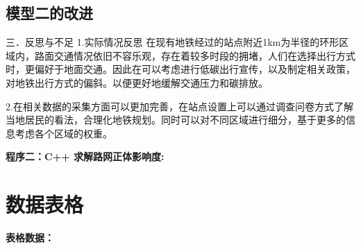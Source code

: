 \documentclass[12pt,a4paper]{mcmthesis}
\begin{document}
    \subsection{模型二的改进}
    三．反思与不足
    1.实际情况反思
    在现有地铁经过的站点附近1km为半径的环形区域内，路面交通情况依旧不容乐观，存在着较多时段的拥堵，人们在选择出行方式时，更偏好于地面交通。因此在可以考虑进行低碳出行宣传，以及制定相关政策，对地铁出行方式的偏斜。以便更好地缓解交通压力和碳排放。

    2.在相关数据的采集方面可以更加完善，在站点设置上可以通过调查问卷方式了解当地居民的看法，合理化地铁规划。同时可以对不同区域进行细分，基于更多的信息考虑各个区域的权重。

    \textcolor[rgb]{0.98,0.00,0.00}{\textbf{程序二：C++ 求解路网正体影响度:}}
    

    \newpage
    \setcounter{table}{0}
    \section*{数据表格}
    \textcolor[rgb]{0.98,0.00,0.00}{\textbf{表格数据：}}
    
\end{document}
